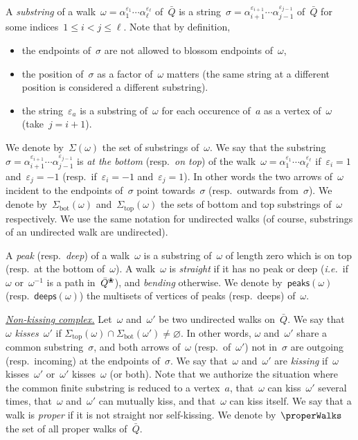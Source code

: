 \documentclass{amsart}
\theoremstyle{definition}
\newcommand{\ie}{\textit{i.e.}~} %
\newcommand{\darkblue}{\color{darkblue}} %
\newcommand{\defn}[1]{\textsl{\darkblue #1}} %
\newcommand{\para}[1]{\medskip\noindent\uline{\textit{#1.}}} %
\newcommand{\quiver}{\bar Q} %
\newcommand{\blossom}{^\text{\ding{96}}} %
\renewcommand{\top}{\mathrm{top}} %
\newcommand{\bottom}{\mathrm{bot}} %
\newcommand{\peaks}[1]{\mathsf{peaks}(#1)} %
\newcommand{\deeps}[1]{\mathsf{deeps}(#1)} %
\begin{document}
A \defn{substring} of a walk~$\omega = \alpha_1^{\varepsilon_1} \cdots \alpha_\ell^{\varepsilon_\ell}$ of~$\quiver$ is a string~$\sigma = \alpha_{i+1}^{\varepsilon_{i+1}} \cdots \alpha_{j-1}^{\varepsilon_{j-1}}$ of~$\quiver$ for some indices~$1 \le i < j \le \ell$. Note that by definition,
\begin{itemize}
\item the endpoints of~$\sigma$ are not allowed to blossom endpoints of~$\omega$,
\item the position of~$\sigma$ as a factor of~$\omega$ matters (the same string at a different position is considered a different substring).
\item the string~$\varepsilon_a$ is a substring of~$\omega$ for each occurence of~$a$ as a vertex of~$\omega$ (take~$j = i+1$).
\end{itemize}
We denote by~$\Sigma(\omega)$ the set of substrings of~$\omega$.
We say that the substring~$\sigma = \alpha_{i+1}^{\varepsilon_{i+1}} \cdots \alpha_{j-1}^{\varepsilon_{j-1}}$ is \defn{at the bottom} (resp.~\defn{on top}) of the walk~$\omega = \alpha_1^{\varepsilon_1} \cdots \alpha_\ell^{\varepsilon_\ell}$ if~$\varepsilon_i = 1$ and~$\varepsilon_j = -1$ (resp.~if~$\varepsilon_i = -1$ and~$\varepsilon_j = 1$).
In other words the two arrows of~$\omega$ incident to the endpoints of~$\sigma$ point towards~$\sigma$ (resp.~outwards from~$\sigma$).
We denote by~$\Sigma_\bottom(\omega)$ and~$\Sigma_\top(\omega)$ the sets of bottom and top substrings of~$\omega$ respectively.
We use the same notation for undirected walks (of course, substrings of an undirected walk are undirected).

A \defn{peak} (resp.~\defn{deep}) of a walk~$\omega$ is a substring of~$\omega$ of length zero which is on top (resp.~at the bottom of~$\omega$).
A walk~$\omega$ is \defn{straight} if it has no peak or deep (\ie if~$\omega$ or~$\omega^{-1}$ is a path in~$\bar Q\blossom$), and \defn{bending} otherwise.
We denote by~$\peaks{\omega}$ (resp.~$\deeps{\omega}$) the multisets of vertices of peaks (resp.~deeps) of~$\omega$.

\para{Non-kissing complex}
%
Let~$\omega$ and~$\omega'$ be two undirected walks on~$\quiver$.
We say that~$\omega$ \defn{kisses}~$\omega'$ if ${\Sigma_\top(\omega) \cap \Sigma_\bottom(\omega')} \ne \varnothing$.
In other words, $\omega$ and~$\omega'$ share a common substring~$\sigma$, and both arrows of~$\omega$ (resp.~of~$\omega'$) not in~$\sigma$ are outgoing (resp.~incoming) at the endpoints of~$\sigma$.
We say that~$\omega$ and~$\omega'$ are \defn{kissing} if~$\omega$ kisses~$\omega'$ or~$\omega'$ kisses~$\omega$ (or both).
Note that we authorize the situation where the common finite substring is reduced to a vertex~$a$, that~$\omega$ can kiss~$\omega'$ several times, that~$\omega$ and~$\omega'$ can mutually kiss, and that~$\omega$ can kiss itself.
We say that a walk is \defn{proper} if it is not straight nor self-kissing.
We denote by~$\properWalks$ the set of all proper walks of~$\quiver$.
\end{document}
